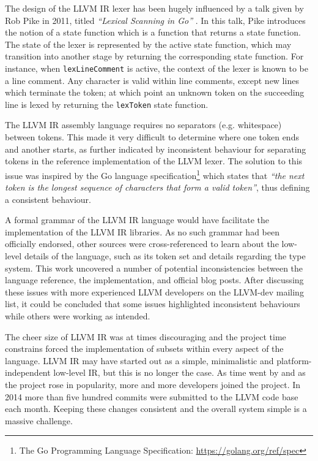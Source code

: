 The design of the LLVM IR lexer has been hugely influenced by a talk given by Rob Pike in 2011, titled \textit{``Lexical Scanning in Go''} \cite{lexical_scanning_in_go}. In this talk, Pike introduces the notion of a state function which is a function that returns a state function. The state of the lexer is represented by the active state function, which may transition into another stage by returning the corresponding state function. For instance, when \texttt{lexLineComment} is active, the context of the lexer is known to be a line comment. Any character is valid within line comments, except new lines which terminate the token; at which point an unknown token on the succeeding line is lexed by returning the \texttt{lexToken} state function.

The LLVM IR assembly language requires no separators (e.g. whitespace) between tokens. This made it very difficult to determine where one token ends and another starts, as further indicated by inconsistent behaviour for separating tokens in the reference implementation of the LLVM lexer. The solution to this issue was inspired by the Go language specification\footnote{The Go Programming Language Specification: \url{https://golang.org/ref/spec}} which states that \textit{``the next token is the longest sequence of characters that form a valid token''}, thus defining a consistent behaviour.

A formal grammar of the LLVM IR language would have facilitate the implementation of the LLVM IR libraries. As no such grammar had been officially endorsed, other sources were cross-referenced to learn about the low-level details of the language, such as its token set and details regarding the type system. This work uncovered a number of potential inconsistencies between the language reference, the implementation, and official blog posts. After discussing these issues with more experienced LLVM developers on the LLVM-dev mailing list, it could be concluded that some issues highlighted inconsistent behaviours while others were working as intended.

The cheer size of LLVM IR was at times discouraging and the project time constrains forced the implementation of subsets within every aspect of the language. LLVM IR may have started out as a simple, minimalistic and platform-independent low-level IR, but this is no longer the case. As time went by and as the project rose in popularity, more and more developers joined the project. In 2014 more than five hundred commits were submitted to the LLVM code base each month. Keeping these changes consistent and the overall system simple is a massive challenge.

